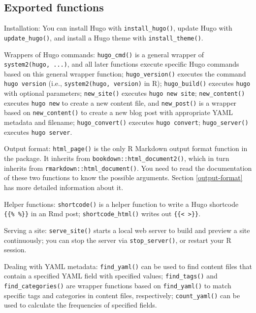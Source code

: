 \documentclass[12pt,]{krantz}
\theoremstyle{definition}
\theoremstyle{definition}
\theoremstyle{definition}
\theoremstyle{remark}
\begin{document}
\subsection{Exported functions}\label{exported-functions}

Installation: You can install Hugo with \texttt{install\_hugo()}, update
Hugo with \texttt{update\_hugo()}, and install a Hugo theme with
\texttt{install\_theme()}.

Wrappers of Hugo commands: \texttt{hugo\_cmd()} is a general wrapper of
\texttt{system2(\textquotesingle{}hugo\textquotesingle{},\ ...)}, and
all later functions execute specific Hugo commands based on this general
wrapper function; \texttt{hugo\_version()} executes the command
\texttt{hugo\ version} (i.e.,
\texttt{system2(\textquotesingle{}hugo\textquotesingle{},\ \textquotesingle{}version\textquotesingle{})}
in R); \texttt{hugo\_build()} executes \texttt{hugo} with optional
parameters; \texttt{new\_site()} executes \texttt{hugo\ new\ site};
\texttt{new\_content()} executes \texttt{hugo\ new} to create a new
content file, and \texttt{new\_post()} is a wrapper based on
\texttt{new\_content()} to create a new blog post with appropriate YAML
metadata and filename; \texttt{hugo\_convert()} executes
\texttt{hugo\ convert}; \texttt{hugo\_server()} executes
\texttt{hugo\ server}.

Output format: \texttt{html\_page()} is the only R Markdown output
format function in the package. It inherits from
\texttt{bookdown::html\_document2()}, which in turn inherits from
\texttt{rmarkdown::html\_document()}. You need to read the documentation
of these two functions to know the possible arguments. Section
\ref{output-format} has more detailed information about it.

Helper functions: \texttt{shortcode()} is a helper function to write a
Hugo shortcode \texttt{\{\{\%\ \%\}\}} in an Rmd post;
\texttt{shortcode\_html()} writes out
\texttt{\{\{\textless{}\ \textgreater{}\}\}}.

Serving a site: \texttt{serve\_site()} starts a local web server to
build and preview a site continuously; you can stop the server via
\texttt{stop\_server()}, or restart your R session.

Dealing with YAML metadata: \texttt{find\_yaml()} can be used to find
content files that contain a specified YAML field with specified values;
\texttt{find\_tags()} and \texttt{find\_categories()} are wrapper
functions based on \texttt{find\_yaml()} to match specific tags and
categories in content files, respectively; \texttt{count\_yaml()} can be
used to calculate the frequencies of specified fields.
\end{document}
